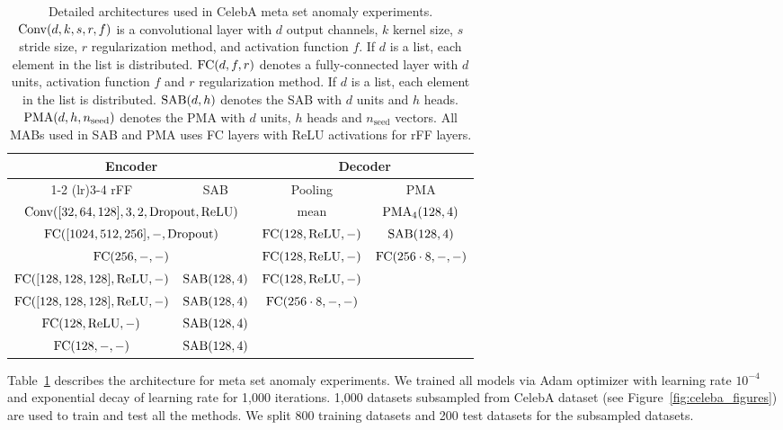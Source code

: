 \documentclass{article}
\begin{document}
\begin{table}[h]
\small
\centering
\caption{Detailed architectures used in CelebA meta set anomaly experiments.
$\mathrm{Conv}(d, k, s, r, f)$ is a convolutional layer with $d$ output channels, $k$ kernel size, $s$ stride size, $r$ regularization method, and activation function $f$. If $d$ is a list, each element in the list is distributed.
$\mathrm{FC}(d, f, r)$ denotes a fully-connected layer with $d$ units, activation function $f$ and $r$ regularization method.
If ${d}$ is a list, each element in the list is distributed.
$\mathrm{SAB}(d, h)$ denotes the SAB with $d$ units and $h$ heads.
$\mathrm{PMA}(d, h, n_{\mathrm{seed}})$ denotes the PMA with $d$ units, $h$ heads and $n_{\mathrm{seed}}$ vectors.
All MABs used in SAB and PMA uses FC layers with ReLU activations for rFF layers.}
\vspace{5pt}
\begin{tabular}{@{}cccc@{}}\toprule
\multicolumn{2}{c}{Encoder} & \multicolumn{2}{c}{Decoder}\\
\cmidrule(lr){1-2} \cmidrule(lr){3-4}
rFF & SAB & Pooling & PMA \\
\midrule
\multicolumn{2}{c}{$\mathrm{Conv}([32, 64, 128], 3, 2, \mathrm{Dropout}, \mathrm{ReLU})$} & $\mathrm{mean}$ & $\mathrm{PMA}_4(128, 4)$ \\
\multicolumn{2}{c}{$\mathrm{FC}([1024, 512, 256], -, \mathrm{Dropout})$} & $\mathrm{FC}(128, \mathrm{ReLU}, -)$ & $\mathrm{SAB}(128, 4)$ \\
\multicolumn{2}{c}{$\mathrm{FC}(256, -, -)$} & $\mathrm{FC}(128, \mathrm{ReLU}, -)$ & $\mathrm{FC}(256 \cdot 8, -, -)$ \\
$\mathrm{FC}([128, 128, 128], \mathrm{ReLU}, -)$ & $\mathrm{SAB}(128,4)$ & $\mathrm{FC}(128, \mathrm{ReLU}, -)$ & \\
$\mathrm{FC}([128, 128, 128], \mathrm{ReLU}, -)$ & $\mathrm{SAB}(128,4)$  & $\mathrm{FC}(256 \cdot 8, -, -)$ & \\
$\mathrm{FC}(128, \mathrm{ReLU}, -)$ & $\mathrm{SAB}(128,4)$ & & \\
$\mathrm{FC}(128, -, -)$ & $\mathrm{SAB}(128, 4)$ & & \\
\bottomrule
\end{tabular}
\label{tab:meta_anomaly_architecture}
\end{table}

Table~\ref{tab:meta_anomaly_architecture} describes the architecture for meta set anomaly experiments.
We trained all models via Adam optimizer with learning rate $10^{-4}$ and exponential decay of learning rate for 1,000 iterations.
1,000 datasets subsampled from CelebA dataset (see Figure~\ref{fig:celeba_figures}) are used to train and test all the methods.
We split 800 training datasets and 200 test datasets for the subsampled datasets.
\end{document}
